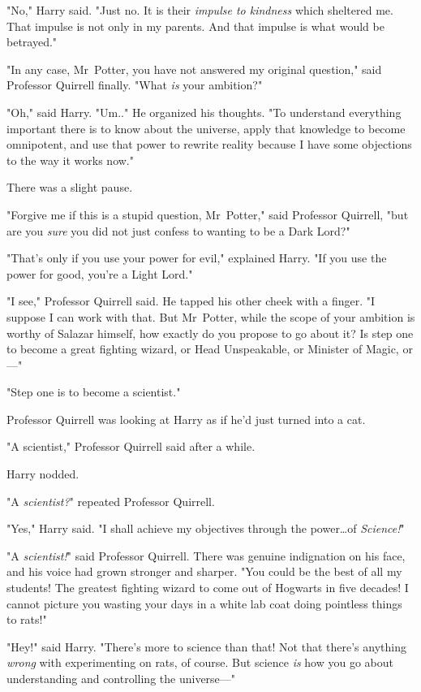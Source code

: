 "No," Harry said. "Just no. It is their \emph{impulse to kindness} which
sheltered me. That impulse is not only in my parents. And that impulse is what
would be betrayed."

"In any case, Mr~Potter, you have not answered my original question," said
Professor Quirrell finally. "What \emph{is} your ambition?"

"Oh," said Harry. "Um.." He organized his thoughts. "To understand everything
important there is to know about the universe, apply that knowledge to become
omnipotent, and use that power to rewrite reality because I have some
objections to the way it works now."

There was a slight pause.

"Forgive me if this is a stupid question, Mr~Potter," said Professor Quirrell,
"but are you \emph{sure} you did not just confess to wanting to be a Dark Lord?"

"That's only if you use your power for evil," explained Harry. "If you use the
power for good, you're a Light Lord."

"I see," Professor Quirrell said. He tapped his other cheek with a finger. "I
suppose I can work with that. But Mr~Potter, while the scope of your ambition
is worthy of Salazar himself, how exactly do you propose to go about it? Is
step one to become a great fighting wizard, or Head Unspeakable, or Minister of
Magic, or---"

"Step one is to become a scientist."

Professor Quirrell was looking at Harry as if he'd just turned into a cat.

"A scientist," Professor Quirrell said after a while.

Harry nodded.

"A \emph{scientist?}" repeated Professor Quirrell.

"Yes," Harry said. "I shall achieve my objectives through the power…of
\emph{Science!}"

"A \emph{scientist!}" said Professor Quirrell. There was genuine indignation on
his face, and his voice had grown stronger and sharper. "You could be the best
of all my students! The greatest fighting wizard to come out of Hogwarts in
five decades! I cannot picture you wasting your days in a white lab coat doing
pointless things to rats!"

"Hey!" said Harry. "There's more to science than that! Not that there's
anything \emph{wrong} with experimenting on rats, of course. But science
\emph{is} how you go about understanding and controlling the universe---"

